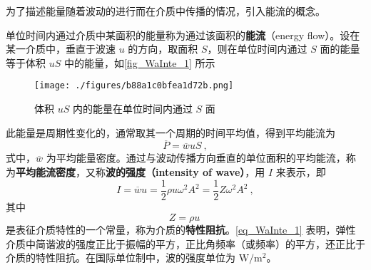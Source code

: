 
\begin{issues}
\end{issues}


为了描述能量随着波动的进行而在介质中传播的情况，引入能流的概念。

单位时间内通过介质中某面积的能量称为通过该面积的\textbf{能流}（energy flow）。设在某一介质中，垂直于波速 $u$ 的方向，取面积 $S$，则在单位时间内通过 $S$ 面的能量等于体积 $uS$ 中的能量，如\autoref{fig_WaInte_1} 所示
\begin{figure}[ht]
\centering
\texttt{[image: ./figures/b88a1c0bfea1d72b.png]}
\caption{体积 $uS$ 内的能量在单位时间内通过 $S$ 面} \label{fig_WaInte_1}
\end{figure}

此能量是周期性变化的，通常取其一个周期的时间平均值，得到平均能流为
\begin{equation}
\overline{P}=\overline{w} u S~,
\end{equation}
式中，$\overline w$ 为平均能量密度。通过与波动传播方向垂直的单位面积的平均能流，称为\textbf{平均能流密度}，又称\textbf{波的强度（intensity of wave）}，用 $I$ 来表示，即
\begin{equation} \label{eq_WaInte_1}
I=\overline{w} u=\frac{1}{2} \rho u \omega^{2} A^{2}=\frac{1}{2} Z \omega^{2} A^{2}~,
\end{equation}
其中
\begin{equation}
Z=\rho u~
\end{equation}
是表征介质特性的一个常量，称为介质的\textbf{特性阻抗}。\autoref{eq_WaInte_1} 表明，弹性介质中简谐波的强度正比于振幅的平方，正比角频率（或频率）的平方，还正比于介质的特性阻抗。在国际单位制中，波的强度单位为 $\mathrm{W}/\mathrm{m^2}$。
